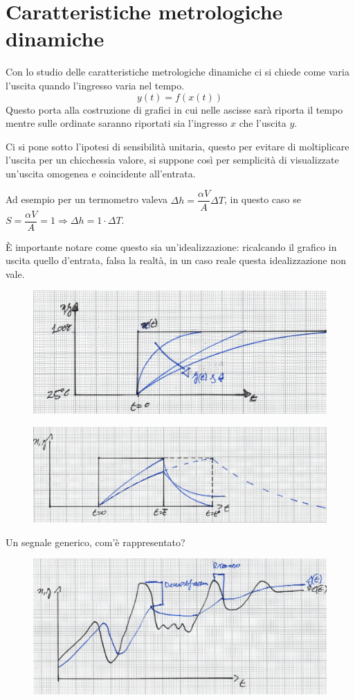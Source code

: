 \documentclass[a4paper, 15pt]{article}
\begin{document}
\section{Caratteristiche metrologiche dinamiche}  
\begin{adjustwidth}{2in}{}
	Con lo studio delle caratteristiche metrologiche dinamiche ci si chiede come varia l'uscita quando l'ingresso varia nel tempo. 
	\[y(t) = f(x(t))\]
	Questo porta alla costruzione di grafici in cui nelle ascisse sarà riporta il tempo mentre sulle ordinate saranno riportati sia l'ingresso $x$ che l'uscita $y$. \newline 
	
	Ci si pone sotto l'ipotesi di sensibilità unitaria, questo per evitare di moltiplicare l'uscita per un chicchessia valore, si suppone così per semplicità di visualizzate un'uscita omogenea e coincidente all'entrata. 
	
	Ad esempio per un termometro valeva $\Delta h = \dfrac{\alpha V}{A}\Delta T$, in questo caso se \newline $S = \dfrac{\alpha V}{A} = 1 \Rightarrow \Delta h = 1 \cdot \Delta T$. 
	
	È importante notare come questo sia un'idealizzazione: ricalcando il grafico in uscita quello d'entrata, falsa la realtà, in un caso reale questa idealizzazione non vale. 
	
 
\begin{figure}[H]
	\centering
	\includegraphics[width=0.5\linewidth]{fig/screenshot045}
	\label{fig:screenshot045}
\end{figure}

\begin{figure}[H]
	\centering
	\includegraphics[width=0.5\linewidth]{fig/screenshot046}
	\label{fig:screenshot046}
\end{figure}

	Un segnale generico, com'è rappresentato? 
	
\begin{figure}[H]
	\centering
	\includegraphics[width=0.5\linewidth]{fig/screenshot047}
	\label{fig:screenshot047}
\end{figure}


\end{adjustwidth}
\end{document}
